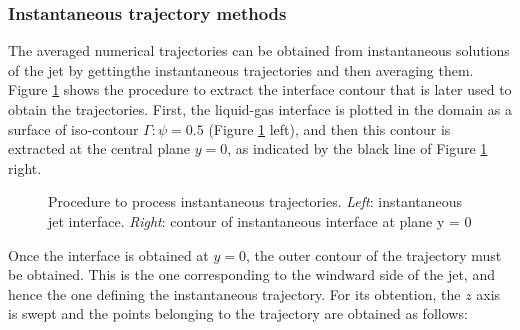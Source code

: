 \subsubsection{Instantaneous trajectory methods}

The averaged numerical trajectories can be obtained from instantaneous solutions of the jet by gettingthe instantaneous trajectories and then averaging them. Figure \ref{fig:trajectory_obtention_instantaneous_general} shows the procedure to extract the interface contour that is later used to obtain the trajectories. First, the liquid-gas interface is plotted in the domain as a surface of iso-contour $\Gamma: \psi = 0.5$ (Figure \ref{fig:trajectory_obtention_instantaneous_general} left), and then this contour is extracted at the central plane $y = 0$, as indicated by the black line of Figure \ref{fig:trajectory_obtention_instantaneous_general} right. 

\begin{figure}[h]
     \centering
     \begin{subfigure}[b]{0.45\textwidth}
         \centering
     \end{subfigure}
     \begin{subfigure}[b]{0.45\textwidth}
         \centering
     \end{subfigure}
        \caption[Procedure to obtain instantaneous trajectories.]{Procedure to process instantaneous trajectories. \textsl{Left}: instantaneous jet interface. \textsl{Right}: contour of instantaneous interface at plane y = 0}
        \label{fig:trajectory_obtention_instantaneous_general}
\end{figure}

Once the interface is obtained at $y = 0$, the outer contour of the trajectory must be obtained. This is the one corresponding to the windward side of the jet, and hence the one defining the instantaneous trajectory. For its obtention, the $z$ axis is swept and the points belonging to the trajectory are obtained as follows:


